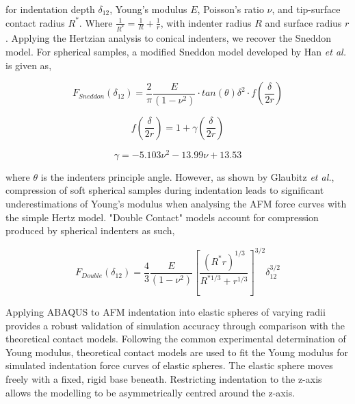 for indentation depth $\delta_{12}$, Young’s modulus $E$, Poisson’s ratio $\nu$, and tip-surface contact radius $R^*$. Where $\frac{1}{R^*} = \frac{1}{R} + \frac{1}{r}$, with indenter radius $R$ and surface radius $r$. Applying the Hertzian analysis to conical indenters, we recover the Sneddon model\cite{sneddon1965relation}. For spherical samples, a modified Sneddon model developed by Han \textit{et al.}\cite{han2021modified} is given as,

\begin{equation}F_{Sneddon}(\delta_{12}) = \frac{2}{\pi}\frac{E}{(1-\nu^2)} \cdot tan(\theta)\delta^{2} \cdot f\left(\frac{\delta}{2r}\right)\label{eq: Sneddon}\end{equation}

\begin{equation}  f\left(\frac{\delta}{2r}\right) = 1+ \gamma \left(\frac{\delta}{2r}\right) \end{equation}

\begin{equation} \gamma = -5.103\nu^2 - 13.99\nu + 13.53 \end{equation}

where $\theta$ is the indenters principle angle. However, as shown by Glaubitz \textit{et al.}\cite{glaubitz2014novel}, compression of soft spherical samples during indentation leads to significant underestimations of Young's modulus when analysing the AFM force curves with the simple Hertz model. "Double Contact" models\cite{glaubitz2014novel, dokukin2013quantitative} account for compression produced by spherical indenters as such,

\begin{equation}  F_{Double}(\delta_{12}) =  \frac{4}{3} \frac{E}{(1-\nu^2)} \left[ \frac{(R^*r)^{1/3}}{R^{* 1/3}+r^{1/3}} \right]^{3/2}\delta_{12}^{3/2} \label{eq: Hertz Double Contact}\end{equation}

Applying ABAQUS to AFM indentation into elastic spheres of varying radii provides a robust validation of simulation accuracy through comparison with the theoretical contact models. Following the common experimental determination of Young modulus\cite{sun2021determination,DIMITRIADIS20022798, vinckier1998measuring, kontomaris2019determination, kontomaris2020hertz}, theoretical contact models are used to fit the Young modulus for simulated indentation force curves of elastic spheres. The elastic sphere moves freely with a fixed, rigid base beneath. Restricting indentation to the z-axis allows the modelling to be asymmetrically centred around the z-axis.

